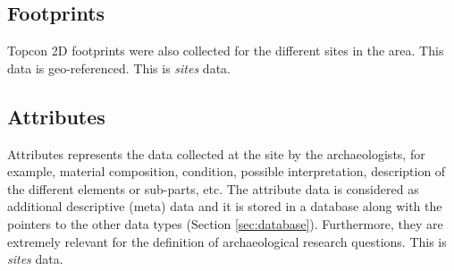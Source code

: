 \subsection{Footprints}
Topcon 2D footprints were also collected for the different sites in the area. This data is geo-referenced. This is \textit{sites} data.

\subsection{Attributes}
Attributes represents the data collected at the site by the archaeologists, 
for example, material composition, condition, possible interpretation,
description of the different elements or sub-parts, etc. The attribute data
is considered as additional descriptive (meta) data and it is stored in a
database along with the pointers to the other data types (Section
\ref{sec:database}). Furthermore, they are extremely relevant for the definition
of archaeological research questions. This is \textit{sites} data.
